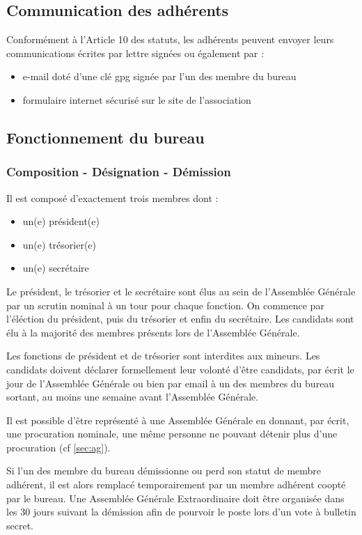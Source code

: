 \documentclass[a4paper,french,10pt]{article}
\begin{document}
\subsection{Communication des adhérents}
Conformément à l'Article 10 des statuts, les adhérents peuvent envoyer leurs communications écrites par lettre signées ou également par :
\begin{itemize}
\item e-mail doté d'une clé gpg signée par l'un des membre du bureau
\item formulaire internet sécurisé sur le site de l'association
\end{itemize}


\subsection{Fonctionnement du bureau}

\subsubsection*{Composition - Désignation - Démission}
\label{sec:comp-design}
Il est composé d'exactement trois membres dont :
\begin{itemize}
\item un(e) président(e)
\item un(e) trésorier(e)
\item un(e) secrétaire
\end{itemize}

Le président, le trésorier et le secrétaire sont élus au sein de
l'Assemblée Générale par un scrutin nominal à un tour pour chaque
fonction. On commence par l'éléction du président, puis du trésorier
et enfin du secrétaire.  Les candidats sont élu à la majorité des
membres présents lors de l'Assemblée Générale.

Les fonctions de président et de trésorier sont interdites aux mineurs. Les candidats doivent déclarer
formellement leur volonté d'être candidats, par écrit le jour de l'Assemblée Générale
ou bien par email à un des membres du bureau sortant, au moins une
semaine avant l'Assemblée Générale.


Il est possible d’être représenté à une Assemblée Générale en donnant, par écrit, une procuration nominale, une même personne ne pouvant détenir plus
d’une procuration (cf \ref{sec:ag}).

Si l'un des membre du bureau démissionne ou perd son statut de membre adhérent, il est alors remplacé temporairement par un membre adhérent coopté par le bureau. Une Assemblée Générale Extraordinaire doit être organisée dans les 30 jours suivant la démission afin de pourvoir le poste lors d'un vote à bulletin secret.
\end{document}
